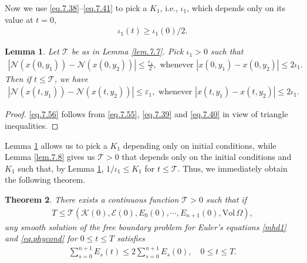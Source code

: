 \documentclass[12pt,reqno]{amsart}
\numberwithin{equation}{section}
\newtheorem{theorem}{Theorem}[section]
\newtheorem{lemma}[theorem]{Lemma}
\theoremstyle{definition}
\theoremstyle{remark}
\begin{document}
Now we use \eqref{eq.7.38}--\eqref{eq.7.41} to pick a $K_1$, i.e., $\iota_1$, which depends only on its value at $t=0$,
\begin{align}
  \iota_1(t){\geqslant} \iota_1(0)/2.
\end{align}

\begin{lemma}\label{lem.7.9}
  Let ${\mathcal{T}}$ be as in Lemma \ref{lem.7.7}. Pick $\iota_1>0$ such that
  \begin{align}\label{eq.7.55}
    {\left\vert{{\mathcal{N}}(x(0,y_1))-{\mathcal{N}}(x(0,y_2))}\right\vert}{\leqslant} \frac{{\varepsilon}_1}{2}, \text{ whenever } {\left\vert{x(0,y_1)-x(0,y_2)}\right\vert}{\leqslant} 2\iota_1.
  \end{align}
  Then if $t{\leqslant} {\mathcal{T}}$, we have
  \begin{align}\label{eq.7.56}
    {\left\vert{{\mathcal{N}}(x(t,y_1))-{\mathcal{N}}(x(t,y_2))}\right\vert}{\leqslant} {\varepsilon}_1, \text{ whenever } {\left\vert{x(t,y_1)-x(t,y_2)}\right\vert}{\leqslant} 2\iota_1.
  \end{align}
\end{lemma}

\begin{proof}
  \eqref{eq.7.56} follows from \eqref{eq.7.55}, \eqref{eq.7.39} and \eqref{eq.7.40} in view of triangle inequalities.
\end{proof}

Lemma \ref{lem.7.9} allows us to pick a $K_1$ depending only on initial conditions, while Lemma \ref{lem.7.8} gives us ${\mathcal{T}}>0$ that depends only on the initial conditions and $K_1$ such that, by Lemma \ref{lem.7.9}, $1/\iota_1{\leqslant} K_1$ for $t{\leqslant} {\mathcal{T}}$. Thus, we immediately obtain the following theorem.

\begin{theorem}
  There exists a continuous function ${\mathcal{T}}>0$ such that if
  \begin{align}
    T{\leqslant} {\mathcal{T}}({\mathcal{K}}(0),{\mathcal{E}}(0),E_0(0),\cdots, E_{n+1}(0),{\mathrm{Vol}\,}\Omega),
  \end{align}
  any smooth solution of the free boundary problem for Euler's equations \eqref{mhd1} and \eqref{eq.phycond} for $0{\leqslant} t{\leqslant} T$ satisfies
  \begin{align}
    \sum_{s=0}^{n+1} E_s(t){\leqslant} 2\sum_{s=0}^{n+1} E_s(0), \quad 0{\leqslant} t{\leqslant} T.
  \end{align}
\end{theorem}
\end{document}
